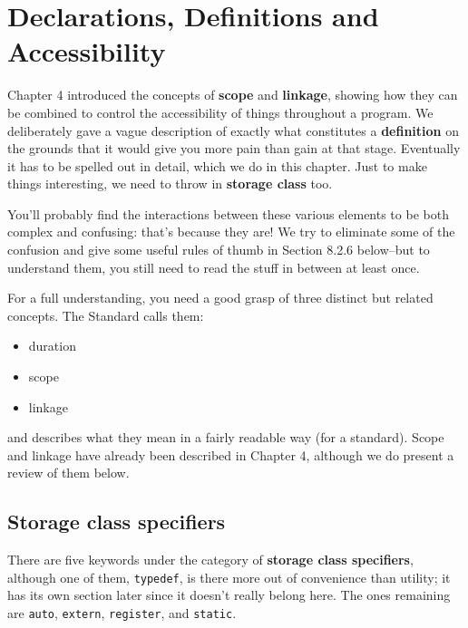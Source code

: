  
        \section{Declarations, Definitions and Accessibility}
        

  

  Chapter 4 introduced the concepts of \textbf{scope} and
   \textbf{linkage}, showing how they can be combined to control the
   accessibility of things throughout a program. We deliberately gave
   a vague description of exactly what constitutes a \textbf{definition}
   on the grounds that it would give you more pain than gain at that stage.
   Eventually it has to be spelled out in detail, which we do in this
   chapter. Just to make things interesting, we need to throw in
   \textbf{storage class} too.


  You'll probably find the interactions between these various elements to
   be both complex and confusing: that's because they are! We try to
   eliminate some of the confusion and give some useful rules of thumb in
   Section 8.2.6 below--but to understand them, you still
   need to read the stuff in between at least once.


  For a full understanding, you need a good grasp of three distinct but
   related concepts. The Standard calls them:


  \begin{itemize}
   \item duration
   \item scope
   \item linkage
  \end{itemize}

  and describes what they mean in a fairly readable way (for a standard).
   Scope and linkage have already been described in Chapter 4,
   although we do present a review of them below.


  \subsection{Storage class specifiers}
   

   There are five keywords under the category of \textbf{storage class
    specifiers}, although one of them, \texttt{typedef}, is there
    more out of convenience than utility; it has its own section later since
    it doesn't really belong here. The ones remaining are \texttt{auto},
    \texttt{extern}, \texttt{register}, and \texttt{static}.


